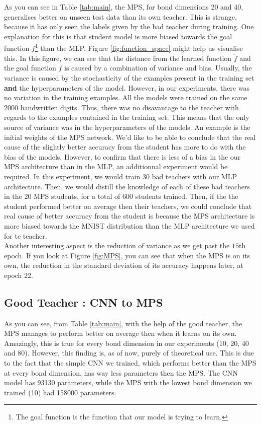 \documentclass{article}
\theoremstyle{definition}
\theoremstyle{definition}
\begin{document}
As you can see in Table \ref{tab:main}, the MPS, for bond dimensions 20 and 40,  generalises better on unseen test data than its own teacher. This is strange, because it has only seen the labels given by the bad teacher during training. One explanation for this is that student model is more biased towards the goal function $f$\footnote{The goal function is the function that our model is trying to learn.} than the MLP. Figure \ref{fig:function_space} might help us visualise this. In this figure, we can see that the distance from the learned function $\tilde{f}$ and the goal function $f$ is caused by a combination of variance and bias. Usually, the variance is caused by the stochasticity of the examples present in the training set {\bf and} the hyperparameters of the model. However, in our experiments, there was no variation in the training examples. All the models were trained on the same $2000$ handwritten digits. Thus, there was no disavantage to the teacher with regards to the examples contained in the training set. This means that the only source of variance was in the hyperparameters of the models. An example is the initial weights of the MPS network. We'd like to be able to conclude that the real cause of the slightly better accuracy from the student has more to do with the bias of the models. However, to confirm that there is less of a bias in the our MPS architecture than in the MLP, an additionnal experiment would be required. In this experiment, we would train $30$ bad teachers with our MLP architecture. Then, we would distill the knowledge of each of these bad teachers in the 20 MPS students, for a total of $600$ students trained. Then, if the the student performed better on average then their teachers, we could conclude that real cause of better accuracy from the student is because the MPS architecture is more biased towards the MNIST distribution than the MLP architecture we used for te teacher. \\ Another interesting aspect is the reduction of variance as we get past the $15$th epoch. If you look at Figure \ref{fig:MPS}, you can see that when the MPS is on its own, the reduction in the standard deviation of its accuracy happens later, at epoch 22.


\subsection{Good Teacher : CNN to MPS}
As you can see, from Table \ref{tab:main}, with the help of the good teacher, the MPS manages to perform better on average then when it learns on its own. Amazingly, this is true for every bond dimension in our experiments (10, 20, 40 and 80). However, this finding is, as of now, purely of theoretical use. This is due to the fact that the simple CNN we trained, which performs better than the MPS at every bond dimension, has way less parameters then the MPS. The CNN model has 93130 parameters, while the MPS with the lowest bond dimension we trained (10) had 158000 parameters.\\
\end{document}
